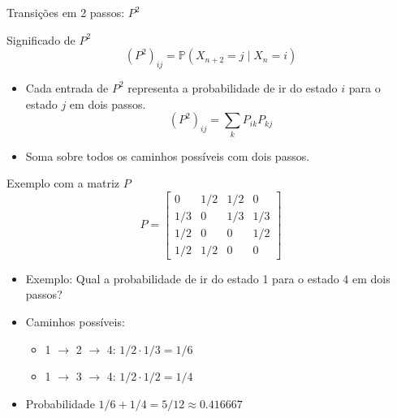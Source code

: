 \documentclass{beamer}
\begin{document}
\begin{frame}{Transições em 2 passos: $P^2$}
  \begin{block}{Significado de $P^2$}
    \[ (P^2)_{ij} = \mathbb{P}(X_{n+2} = j \mid X_n = i) \]
  \end{block}
  \begin{itemize}
  \item Cada entrada de $P^2$ representa a probabilidade de ir do estado $i$ para o estado $j$ em dois passos.
    \[ (P^2)_{ij} = \sum_k P_{ik} P_{kj} \]
  \item Soma sobre todos os caminhos possíveis com dois passos.
  \end{itemize}
\end{frame}


\begin{frame}{Exemplo com a matriz $P$}
  \[ P = \begin{bmatrix}
      0 & {1}/{2} & {1}/{2} & 0 \\
      {1}/{3} & 0 & {1}/{3} & {1}/{3} \\
      {1}/{2} & 0 & 0 & {1}/{2} \\
      {1}/{2} & {1}/{2} & 0 & 0
    \end{bmatrix} \]
  \pause
  \begin{itemize}
  \item Exemplo: Qual a probabilidade de ir do estado 1 para o estado 4 em dois passos?
  \item Caminhos possíveis:
    \begin{itemize}
    \item 1 $\to$ 2 $\to$ 4: ${1}/{2} \cdot {1}/{3} = {1}/{6}$
    \item 1 $\to$ 3 $\to$ 4: ${1}/{2} \cdot {1}/{2} = {1}/{4}$
    \end{itemize}
  \item  Probabilidade ${1}/{6} + {1}/{4} = {5}/{12} \approx 0.416667$
  \end{itemize}
\end{frame}

\end{document}
